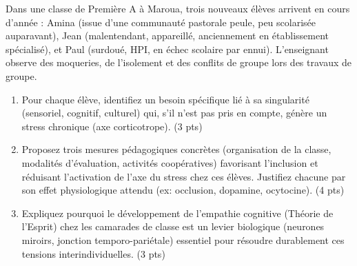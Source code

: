 \documentclass[11pt]{article}
\begin{document}
\begin{exercice}
\label{exo:diversite}
Dans une classe de Première A à Maroua, trois nouveaux élèves arrivent en cours d'année : Amina (issue d'une communauté pastorale peule, peu scolarisée auparavant), Jean (malentendant, appareillé, anciennement en établissement spécialisé), et Paul (surdoué, HPI, en échec scolaire par ennui). L'enseignant observe des moqueries, de l'isolement et des conflits de groupe lors des travaux de groupe.
\begin{enumerate}
    \item Pour chaque élève, identifiez un besoin spécifique lié à sa singularité (sensoriel, cognitif, culturel) qui, s'il n'est pas pris en compte, génère un stress chronique (axe corticotrope). \hfill (3 pts)
    \item Proposez trois mesures pédagogiques concrètes (organisation de la classe, modalités d'évaluation, activités coopératives) favorisant l'inclusion et réduisant l'activation de l'axe du stress chez ces élèves. Justifiez chacune par son effet physiologique attendu (ex: occlusion, dopamine, ocytocine). \hfill (4 pts)
    \item Expliquez pourquoi le développement de l'\og\thinspace{}empathie cognitive\thinspace{}\fg{} (Théorie de l'Esprit) chez les camarades de classe est un levier biologique (neurones miroirs, jonction temporo-pariétale) essentiel pour résoudre durablement ces tensions interindividuelles. \hfill (3 pts)
\end{enumerate}
\end{exercice}
\end{document}
